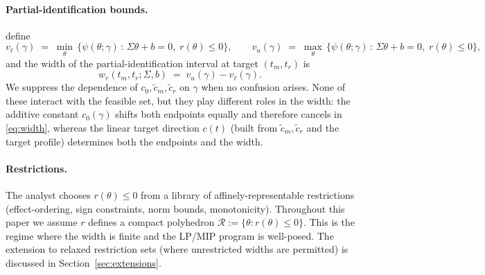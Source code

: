 \paragraph{Partial-identification bounds.}
\citet{boyarsky2026} define
\begin{equation}
\label{eq:bounds}
v_{\ell}(\gamma) \;=\; \min_\theta\,\bigl\{\psi(\theta;\gamma)\,:\,
 \Sigma\theta + b = 0,\; r(\theta)\le 0\bigr\},
\qquad
v_{u}(\gamma) \;=\; \max_\theta\,\bigl\{\psi(\theta;\gamma)\,:\,
 \Sigma\theta + b = 0,\; r(\theta)\le 0\bigr\},
\end{equation}
and the width of the partial-identification interval at target $(t_m,t_r)$ is
\begin{equation}
\label{eq:width}
w_r(t_m, t_r; \Sigma, b) \;=\; v_u(\gamma) - v_\ell(\gamma).
\end{equation}
We suppress the dependence of $c_0, \tilde c_m, \tilde c_r$ on $\gamma$ when no
confusion arises. None of these interact with the feasible set, but they play
different roles in the width: the additive constant $c_0(\gamma)$ shifts both
endpoints equally and therefore cancels in \eqref{eq:width}, whereas the linear
target direction $c(t)$ (built from $\tilde c_m, \tilde c_r$ and the target
profile) determines both the endpoints and the width.

\paragraph{Restrictions.}
The analyst chooses $r(\theta)\le 0$ from a library of affinely-representable
restrictions (effect-ordering, sign constraints, norm bounds, monotonicity).
Throughout this paper we assume $r$ defines a compact polyhedron $\mathcal{R} :=
\{\theta : r(\theta)\le 0\}$. This is the regime where the width is finite and
the LP/MIP program is well-posed. The extension to relaxed
restriction sets (where unrestricted widths are permitted) is discussed in
Section~\ref{sec:extensions}.
